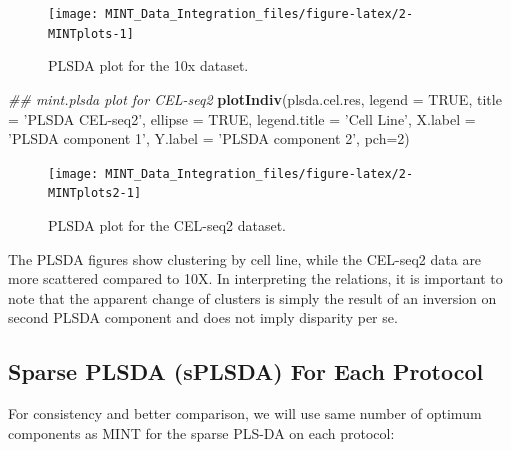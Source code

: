 \documentclass[]{book}
\newenvironment{Shaded}{\begin{snugshade}}{\end{snugshade}}
\newcommand{\CommentTok}[1]{\textcolor[rgb]{0.56,0.35,0.01}{\textit{#1}}}
\newcommand{\DataTypeTok}[1]{\textcolor[rgb]{0.13,0.29,0.53}{#1}}
\newcommand{\DecValTok}[1]{\textcolor[rgb]{0.00,0.00,0.81}{#1}}
\newcommand{\KeywordTok}[1]{\textcolor[rgb]{0.13,0.29,0.53}{\textbf{#1}}}
\newcommand{\NormalTok}[1]{#1}
\newcommand{\OtherTok}[1]{\textcolor[rgb]{0.56,0.35,0.01}{#1}}
\newcommand{\StringTok}[1]{\textcolor[rgb]{0.31,0.60,0.02}{#1}}
\theoremstyle{definition}
\theoremstyle{definition}
\theoremstyle{definition}
\theoremstyle{remark}
\begin{document}
\begin{figure}[ht]

{\centering \texttt{[image: MINT\_Data\_Integration\_files/figure-latex/2-MINTplots-1]} 

}

\caption{PLSDA plot for the 10x dataset.}\label{fig:2-MINTplots}
\end{figure}

\begin{Shaded}
\begin{Highlighting}[]
\CommentTok{## mint.plsda plot for CEL-seq2}
\KeywordTok{plotIndiv}\NormalTok{(plsda.cel.res,}
          \DataTypeTok{legend  =} \OtherTok{TRUE}\NormalTok{, }\DataTypeTok{title     =} \StringTok{'PLSDA CEL-seq2'}\NormalTok{, }
          \DataTypeTok{ellipse =} \OtherTok{TRUE}\NormalTok{, }\DataTypeTok{legend.title =} \StringTok{'Cell Line'}\NormalTok{,}
          \DataTypeTok{X.label =} \StringTok{'PLSDA component 1'}\NormalTok{, }
          \DataTypeTok{Y.label =} \StringTok{'PLSDA component 2'}\NormalTok{, }\DataTypeTok{pch=}\DecValTok{2}\NormalTok{)}
\end{Highlighting}
\end{Shaded}

\begin{figure}[ht]

{\centering \texttt{[image: MINT\_Data\_Integration\_files/figure-latex/2-MINTplots2-1]} 

}

\caption{PLSDA plot for the CEL-seq2 dataset.}\label{fig:2-MINTplots2}
\end{figure}

The PLSDA figures show clustering by cell line, while the CEL-seq2 data
are more scattered compared to 10X. In interpreting the relations, it is
important to note that the apparent change of clusters is simply the
result of an inversion on second PLSDA component and does not imply
disparity per se.

\hypertarget{sparse-plsda-splsda-for-each-protocol}{%
\subsection{Sparse PLSDA (sPLSDA) For Each
Protocol}\label{sparse-plsda-splsda-for-each-protocol}}

For consistency and better comparison, we will use same number of
optimum components as MINT for the sparse PLS-DA on each protocol:
\end{document}
